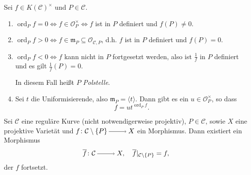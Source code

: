 \documentclass[a4paper,12pt,index=toc]{scrbook}
\theoremstyle{keinenummern} %
\def\CC{\mathcal{C}}
\def\O{\mathcal{O}}
\def\m{\mathfrak{m}}
\newcommand{\ord}{\operatorname{ord}}
\newcommand{\restrict}[1]{|_{#1}}
\def\Bar#1{\ensuremath\overline{#1}}
\begin{document}
\begin{db}\label{4.1.5}
Sei $f\in K(\CC)^{\times}$ und $P\in\CC$.
\begin{enumerate}
\item $\ord_{P}f = 0\iff f\in\O_{P}^{\times}\iff f$ ist in $P$ definiert und $f(P)\neq 0$.
\item $\ord_{P}f>0\iff f\in\m_{P}\subseteq\O_{\CC,P}$, d.h. $f$ ist in $P$ definiert und $f(P)=0$.
\item \mbox{$\ord_{P}f<0 \iff f$} kann nicht in $P$ fortgesetzt werden, also ist $\frac{1}{f}$ in $P$ definiert und es gilt $\frac{1}{f}(P)=0$.

In diesem Fall heißt $P$ \emph{Polstelle}.
\item Sei $t$ die Uniformisierende, also $\m_{P}=\langle t\rangle$. Dann gibt es ein $u\in\O_{P}^{\times}$, so dass
\[f=ut^{\ord_{P}f}.\]
\end{enumerate}\end{db}

\begin{prop}\label{4.1.6}
Sei $\CC$ eine reguläre Kurve (nicht notwendigerweise projektiv), $P\in\CC$, sowie $X$ eine projektive Varietät und $f\colon \CC\setminus\{P\}\ra X$ ein Morphismus. Dann existiert ein Morphismus
\[\Bar{f}\colon \CC\ra X,\quad \Bar{f}\restrict{\CC\setminus\{P\}}=f,\]
der $f$ fortsetzt.
\end{prop}
\end{document}
